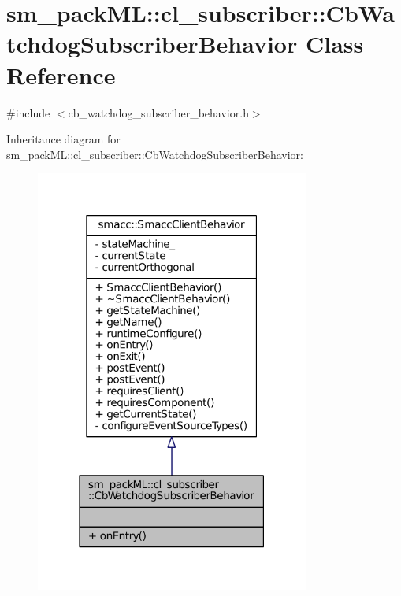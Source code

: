 \hypertarget{classsm__packML_1_1cl__subscriber_1_1CbWatchdogSubscriberBehavior}{}\section{sm\+\_\+pack\+ML\+:\+:cl\+\_\+subscriber\+:\+:Cb\+Watchdog\+Subscriber\+Behavior Class Reference}
\label{classsm__packML_1_1cl__subscriber_1_1CbWatchdogSubscriberBehavior}


{\ttfamily \#include $<$cb\+\_\+watchdog\+\_\+subscriber\+\_\+behavior.\+h$>$}



Inheritance diagram for sm\+\_\+pack\+ML\+:\+:cl\+\_\+subscriber\+:\+:Cb\+Watchdog\+Subscriber\+Behavior\+:
\nopagebreak
\begin{figure}[H]
\begin{center}
\leavevmode
\includegraphics[width=255pt]{classsm__packML_1_1cl__subscriber_1_1CbWatchdogSubscriberBehavior__inherit__graph}
\end{center}
\end{figure}


